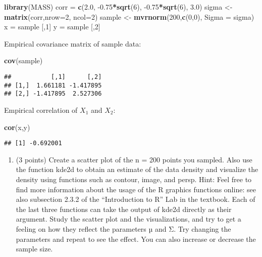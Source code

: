 \documentclass[]{article}
\newenvironment{Shaded}{\begin{snugshade}}{\end{snugshade}}
\newcommand{\DataTypeTok}[1]{\textcolor[rgb]{0.13,0.29,0.53}{#1}}
\newcommand{\DecValTok}[1]{\textcolor[rgb]{0.00,0.00,0.81}{#1}}
\newcommand{\FloatTok}[1]{\textcolor[rgb]{0.00,0.00,0.81}{#1}}
\newcommand{\KeywordTok}[1]{\textcolor[rgb]{0.13,0.29,0.53}{\textbf{#1}}}
\newcommand{\NormalTok}[1]{#1}
\newcommand{\OperatorTok}[1]{\textcolor[rgb]{0.81,0.36,0.00}{\textbf{#1}}}
\newcommand{\StringTok}[1]{\textcolor[rgb]{0.31,0.60,0.02}{#1}}
\providecommand{\tightlist}{%
  \setlength{\itemsep}{0pt}\setlength{\parskip}{0pt}}
\begin{document}
\begin{Shaded}
\begin{Highlighting}[]
\KeywordTok{library}\NormalTok{(MASS)}
\NormalTok{corr =}\StringTok{ }\KeywordTok{c}\NormalTok{(}\FloatTok{2.0}\NormalTok{, }\FloatTok{-0.75}\OperatorTok{*}\KeywordTok{sqrt}\NormalTok{(}\DecValTok{6}\NormalTok{), }\FloatTok{-0.75}\OperatorTok{*}\KeywordTok{sqrt}\NormalTok{(}\DecValTok{6}\NormalTok{), }\FloatTok{3.0}\NormalTok{)}
\NormalTok{sigma <-}\StringTok{ }\KeywordTok{matrix}\NormalTok{(corr,}\DataTypeTok{nrow=}\DecValTok{2}\NormalTok{, }\DataTypeTok{ncol=}\DecValTok{2}\NormalTok{)}
\NormalTok{sample <-}\StringTok{ }\KeywordTok{mvrnorm}\NormalTok{(}\DecValTok{200}\NormalTok{,}\KeywordTok{c}\NormalTok{(}\DecValTok{0}\NormalTok{,}\DecValTok{0}\NormalTok{), }\DataTypeTok{Sigma =}\NormalTok{ sigma)}
\NormalTok{x =}\StringTok{ }\NormalTok{sample [,}\DecValTok{1}\NormalTok{]}
\NormalTok{y =}\StringTok{ }\NormalTok{sample [,}\DecValTok{2}\NormalTok{]}
\end{Highlighting}
\end{Shaded}

Empirical covariance matrix of sample data:

\begin{Shaded}
\begin{Highlighting}[]
\KeywordTok{cov}\NormalTok{(sample)}
\end{Highlighting}
\end{Shaded}

\begin{verbatim}
##           [,1]      [,2]
## [1,]  1.661181 -1.417895
## [2,] -1.417895  2.527306
\end{verbatim}

Empirical correlation of \(X_1\) and \(X_2\):

\begin{Shaded}
\begin{Highlighting}[]
\KeywordTok{cor}\NormalTok{(x,y)}
\end{Highlighting}
\end{Shaded}

\begin{verbatim}
## [1] -0.692001
\end{verbatim}

\begin{enumerate}
\def\labelenumi{\alph{enumi})}
\setcounter{enumi}{1}
\tightlist
\item
  (3 points) Create a scatter plot of the n = 200 points you sampled.
  Also use the function kde2d to obtain an estimate of the data density
  and visualize the density using functions such as contour, image, and
  persp. Hint: Feel free to find more information about the usage of the
  R graphics functions online: see also subsection 2.3.2 of the
  ``Introduction to R'' Lab in the textbook. Each of the last three
  functions can take the output of kde2d directly as their argument.
  Study the scatter plot and the visualizations, and try to get a
  feeling on how they reflect the parameters µ and Σ. Try changing the
  parameters and repeat to see the effect. You can also increase or
  decrease the sample size.
\end{enumerate}
\end{document}
